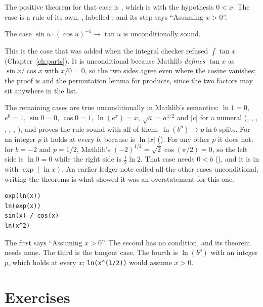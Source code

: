 The positive theorem for that case is , which is 
with the hypothesis $0 < x$. The case is a rule of its own, , labelled
, and its step says ``Assuming $x > 0$''.

\begin{thmbox}
  The case $\sin u \cdot (\cos u)^{-1} \to \tan u$ is unconditionally sound.
\end{thmbox}

This is the case that was added when the integral checker refused $\int \tan x$
(Chapter~\ref{ch:parts}). It is unconditional because Mathlib \emph{defines} $\tan x$ as
$\sin x / \cos x$ with $x/0 = 0$, so the two sides agree even where the cosine vanishes; the
proof is  and the permutation lemma for products, since the two
factors may sit anywhere in the list.

The remaining cases are true unconditionally in Mathlib's semantics: $\ln 1 = 0$, $e^0 = 1$,
$\sin 0 = 0$, $\cos 0 = 1$, $\ln(e^x) = x$, $\sqrt a = a^{1/2}$ and $|c|$ for a numeral
(, , , , ,
, ), and  proves the rule sound with
all of them. $\ln(b^p) \to p \ln b$ splits. For an integer $p$ it holds at every $b$, because
 is $\ln|x|$ (). For any other $p$ it does not: for $b = -2$ and
$p = 1/2$, Mathlib's $(-2)^{1/2} = \sqrt 2 \cos(\pi/2) = 0$, so the left side is $\ln 0 = 0$ while
the right side is $\frac{1}{2}\ln 2$. That case needs $0 < b$ (), and it is in
 with $\exp(\ln x)$. An earlier ledger note called all the other cases
unconditional; writing the theorems is what showed it was an overstatement for this one.

\begin{trybox}
\begin{verbatim}
exp(ln(x))
ln(exp(x))
sin(x) / cos(x)
ln(x^2)
\end{verbatim}
  The first says ``Assuming $x > 0$''. The second has no condition, and its theorem needs none.
  The third is the tangent case. The fourth is $\ln(b^p)$ with an integer $p$, which holds at
  every $x$; \texttt{ln(x\^{}(1/2))} would assume $x > 0$.
\end{trybox}

\section{Exercises}

